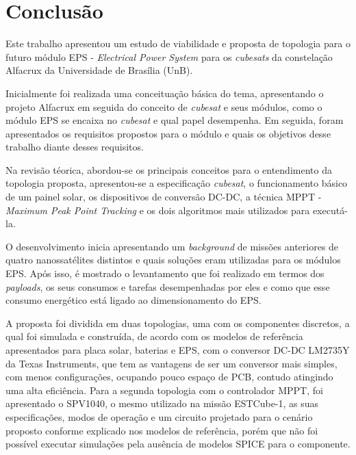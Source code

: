 \chapter{Conclusão} \label{conclusao}

Este trabalho apresentou um estudo de viabilidade e proposta de topologia para o futuro módulo EPS - \textit{Electrical Power System} para os \textit{cubesats} da constelação Alfacrux da Universidade de Brasília (UnB). 

Inicialmente foi realizada uma conceituação básica do tema, apresentando o projeto Alfacrux em seguida do conceito de \textit{cubesat} e seus módulos, como o módulo EPS se encaixa no \textit{cubesat} e qual papel desempenha. Em seguida, foram apresentados os requisitos propostos para o módulo e quais os objetivos desse trabalho diante desses requisitos.

Na revisão téorica, abordou-se os principais conceitos para o entendimento da topologia proposta, apresentou-se a especificação \textit{cubesat}, o funcionamento básico de um painel solar, os dispositivos de conversão DC-DC, a técnica MPPT - \textit{Maximum Peak Point Tracking} e os dois algoritmos mais utilizados para executá-la.

O desenvolvimento inicia apresentando um \textit{background} de missões anteriores de quatro nanossatélites distintos e quais soluções eram utilizadas para os módulos EPS. Após isso, é mostrado o levantamento que foi realizado em termos dos \textit{payloads}, os seus consumos e tarefas desempenhadas por eles e como que esse consumo energético está ligado ao dimensionamento do EPS.

A proposta foi dividida em duas topologias, uma com os componentes discretos, a qual foi simulada e construída, de acordo com os modelos de referência apresentados para placa solar, baterias e EPS, com o conversor DC-DC LM2735Y da Texas Instruments, que tem as vantagens de ser um conversor mais simples, com menos configurações, ocupando pouco espaço de PCB, contudo atingindo uma alta eficiência. Para a segunda topologia com o controlador MPPT, foi apresentado o SPV1040, o mesmo utilizado na missão ESTCube-1, as suas especificações, modos de operação e um circuito projetado para o cenário proposto conforme explicado nos modelos de referência, porém que não foi possível executar simulações pela ausência de modelos SPICE para o componente.

